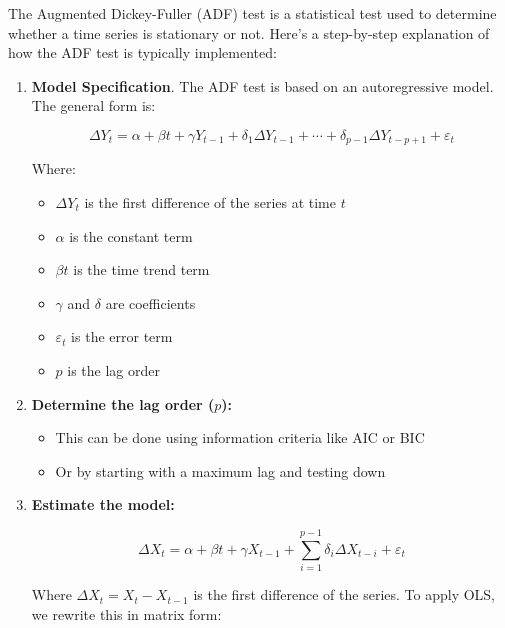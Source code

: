 \documentclass{article}
\begin{document}
    \begin{definition}
      The Augmented Dickey-Fuller (ADF) test is a statistical test used to determine whether a time series is stationary or not. Here's a step-by-step explanation of how the ADF test is typically implemented:

      \begin{enumerate}
        \item \textbf{Model Specification}. The ADF test is based on an autoregressive model. The general form is:
        
        \begin{equation}
        \Delta Y_t = \alpha + \beta t + \gamma Y_{t-1} + \delta_1 \Delta Y_{t-1} + \cdots + \delta_{p-1} \Delta Y_{t-p+1} + \varepsilon_t
        \end{equation}
        
        Where:
        \begin{itemize}
            \item $\Delta Y_t$ is the first difference of the series at time $t$
            \item $\alpha$ is the constant term
            \item $\beta t$ is the time trend term
            \item $\gamma$ and $\delta$ are coefficients
            \item $\varepsilon_t$ is the error term
            \item $p$ is the lag order
        \end{itemize}

        \item \textbf{Determine the lag order ($p$):}
        \begin{itemize}
            \item This can be done using information criteria like AIC or BIC
            \item Or by starting with a maximum lag and testing down
        \end{itemize}

        \item \textbf{Estimate the model:}

        \begin{equation}
        \Delta X_t = \alpha + \beta t + \gamma X_{t-1} + \sum_{i=1}^{p-1} \delta_i \Delta X_{t-i} + \varepsilon_t
        \end{equation}

        Where $\Delta X_t = X_t - X_{t-1}$ is the first difference of the series. To apply OLS, we rewrite this in matrix form:


\end{enumerate}
\end{definition}
\end{document}
